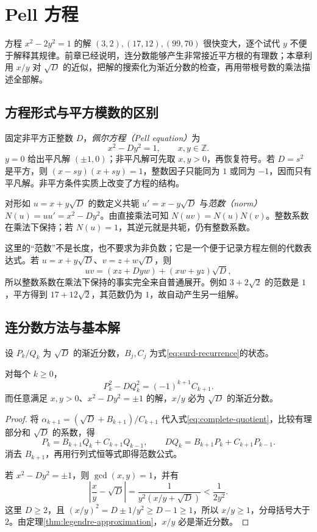 \setcounter{chapter}{11} %
\chapter{Pell 方程}
\label{ch:pell}

方程 $x^2-2y^2=1$ 的解 $(3,2),(17,12),(99,70)$ 很快变大，逐个试代 $y$ 不便于解释其规律。前章已经说明，连分数能够产生非常接近平方根的有理数；本章利用 $x/y$ 对 $\sqrt D$ 的近似，把解的搜索化为渐近分数的检查，再用带根号数的乘法描述全部解。

\section{方程形式与平方模数的区别}

固定非平方正整数 $D$，\emph{佩尔方程（Pell equation）}为
\begin{equation}
 x^2-Dy^2=1,\qquad x,y\in\mathbb Z.
 \label{eq:pell-equation}
\end{equation}
$y=0$ 给出平凡解 $(\pm1,0)$；非平凡解可先取 $x,y>0$，再恢复符号。若 $D=s^2$ 是平方，则 $(x-sy)(x+sy)=1$，整数因子只能同为 $1$ 或同为 $-1$，因而只有平凡解。非平方条件实质上改变了方程的结构。

对形如 $u=x+y\sqrt D$ 的数定义共轭 $u'=x-y\sqrt D$ 与\emph{范数（norm）} $N(u)=uu'=x^2-Dy^2$。由直接乘法可知 $N(uv)=N(u)N(v)$。整数系数在乘法下保持；若 $N(u)=1$，其逆元就是共轭，仍有整数系数。

这里的“范数”不是长度，也不要求为非负数；它是一个便于记录方程左侧的代数表达式。若 $u=x+y\sqrt D$、$v=z+w\sqrt D$，则
\[
 uv=(xz+Dyw)+(xw+yz)\sqrt D,
\]
所以整数系数在乘法下保持的事实完全来自普通展开。例如 $3+2\sqrt2$ 的范数是 $1$，平方得到 $17+12\sqrt2$，其范数仍为 $1$，故自动产生另一组解。

\section{连分数方法与基本解}

设 $P_k/Q_k$ 为 $\sqrt D$ 的渐近分数，$B_j,C_j$ 为式\eqref{eq:surd-recurrence}的状态。

\begin{lemma}
\label{lem:pell-convergent-norm}
对每个 $k\ge0$，
\begin{equation}
 P_k^2-DQ_k^2=(-1)^{k+1}C_{k+1}.
 \label{eq:pell-convergent-norm}
\end{equation}
而任意满足 $x,y>0$、$x^2-Dy^2=\pm1$ 的解，$x/y$ 必为 $\sqrt D$ 的渐近分数。
\end{lemma}
\begin{proof}
将 $\alpha_{k+1}=(\sqrt D+B_{k+1})/C_{k+1}$ 代入式\eqref{eq:complete-quotient}，比较有理部分和 $\sqrt D$ 的系数，得
\[
 P_k=B_{k+1}Q_k+C_{k+1}Q_{k-1},\qquad
 DQ_k=B_{k+1}P_k+C_{k+1}P_{k-1}.
\]
消去 $B_{k+1}$，再用行列式恒等式即得范数公式。

若 $x^2-Dy^2=\pm1$，则 $\gcd(x,y)=1$，并有
\[
 \left|\frac xy-\sqrt D\right|
 =\frac1{y^2(x/y+\sqrt D)}<\frac1{2y^2}.
\]
这里 $D\ge2$，且 $(x/y)^2=D\pm1/y^2\ge D-1\ge1$，所以 $x/y\ge1$，分母括号大于 $2$。由定理\ref{thm:legendre-approximation}，$x/y$ 必是渐近分数。
\end{proof}

